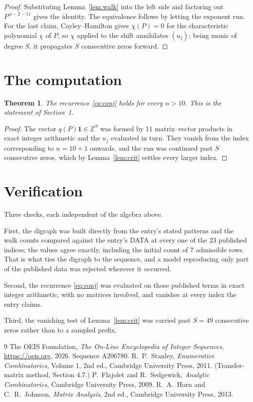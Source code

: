 \documentclass[11pt,a4paper]{article}
\theoremstyle{plain}
\newtheorem{theorem}{Theorem}
\theoremstyle{definition}
\begin{document}
\begin{proof}
Substituting Lemma~\ref{lem:walk} into the left side and factoring out
$P^{\,n-2-11}$ gives the identity. The equivalence follows by letting the exponent
run. For the last claim, Cayley--Hamilton gives $\chi(P)=0$ for the characteristic
polynomial $\chi$ of $P$, so $\chi$ applied to the shift annihilates $(u_j)$; being monic of
degree $S$, it propagates $S$ consecutive zeros forward.
\end{proof}

\section{The computation}

\begin{theorem}
The recurrence \eqref{eq:conj} holds for every $n>10$. This is the statement of
Section~1.
\end{theorem}

\begin{proof}
The vector $q(P)\mathbf{1}\in\mathbb{Z}^{S}$ was formed by $11$ matrix--vector
products in exact integer arithmetic and the $u_j$ evaluated in turn. They vanish from the
index corresponding to $n=10+1$ onwards, and the run was continued past $S$ consecutive
zeros, which by Lemma~\ref{lem:crit} settles every larger index.
\end{proof}

\section{Verification}

Three checks, each independent of the algebra above.

First, the digraph was built directly from the entry's stated patterns and the walk counts
compared against the entry's DATA at every one of the $23$ published indices; the
values agree exactly, including the initial count of $7$ admissible rows. That is
what ties the digraph to the sequence, and a model reproducing only part of the published
data was rejected wherever it occurred.

Second, the recurrence \eqref{eq:conj} was evaluated on those published terms in exact
integer arithmetic, with no matrices involved, and vanishes at every index the entry claims.

Third, the vanishing test of Lemma~\ref{lem:crit} was carried past $S=49$ consecutive
zeros rather than to a sampled prefix.

\begin{thebibliography}{9}
 The OEIS Foundation, \emph{The On-Line Encyclopedia of Integer
Sequences}, \url{https://oeis.org}, 2026. Sequence A206780.
 R.~P.~Stanley, \emph{Enumerative Combinatorics}, Volume 1, 2nd ed.,
Cambridge University Press, 2011. (Transfer-matrix method, Section 4.7.)
 P.~Flajolet and R.~Sedgewick, \emph{Analytic Combinatorics}, Cambridge
University Press, 2009.
 R.~A.~Horn and C.~R.~Johnson, \emph{Matrix Analysis}, 2nd ed., Cambridge
University Press, 2013.
\end{thebibliography}
\end{document}
